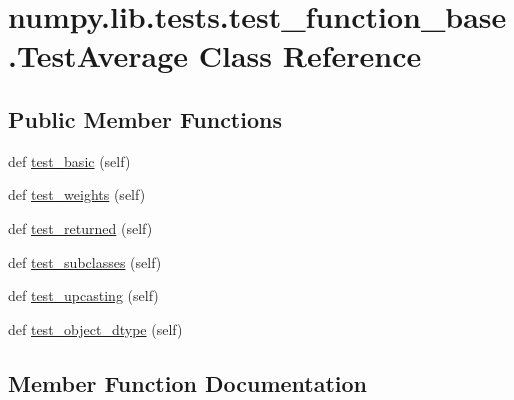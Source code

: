 \hypertarget{classnumpy_1_1lib_1_1tests_1_1test__function__base_1_1TestAverage}{}\section{numpy.\+lib.\+tests.\+test\+\_\+function\+\_\+base.\+Test\+Average Class Reference}
\label{classnumpy_1_1lib_1_1tests_1_1test__function__base_1_1TestAverage}
\subsection*{Public Member Functions}
\begin{DoxyCompactItemize}
\item 
def \hyperlink{classnumpy_1_1lib_1_1tests_1_1test__function__base_1_1TestAverage_aa8e9916718cb3c49b20d9e408bb4a69c}{test\+\_\+basic} (self)
\item 
def \hyperlink{classnumpy_1_1lib_1_1tests_1_1test__function__base_1_1TestAverage_ac134609432dbc798f86a11c5eb1a8dff}{test\+\_\+weights} (self)
\item 
def \hyperlink{classnumpy_1_1lib_1_1tests_1_1test__function__base_1_1TestAverage_a3ecad5785b5d1cb1b025e16353112e9e}{test\+\_\+returned} (self)
\item 
def \hyperlink{classnumpy_1_1lib_1_1tests_1_1test__function__base_1_1TestAverage_af800eb5ec12760812c557998e1779e39}{test\+\_\+subclasses} (self)
\item 
def \hyperlink{classnumpy_1_1lib_1_1tests_1_1test__function__base_1_1TestAverage_ad09e5942862060ef1b617ecd2e794b10}{test\+\_\+upcasting} (self)
\item 
def \hyperlink{classnumpy_1_1lib_1_1tests_1_1test__function__base_1_1TestAverage_afab0dac36d3018e6de8f3682f5906106}{test\+\_\+object\+\_\+dtype} (self)
\end{DoxyCompactItemize}


\subsection{Member Function Documentation}
\mbox{\label{classnumpy_1_1lib_1_1tests_1_1test__function__base_1_1TestAverage_aa8e9916718cb3c49b20d9e408bb4a69c}} 
